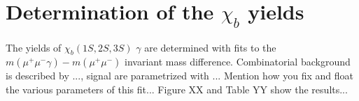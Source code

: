 % 

\section{Determination of the $\chi_b$ yields}
\label{sec:ChibFit}

The yields of $\chi_b(1S, 2S, 3S)$ \to \OneS $\gamma$ are determined with fits to the $m(\mu^+\mu^-\gamma) - m(\mu^+\mu^-)$ invariant mass difference. Combinatorial background is 
described by ..., signal are parametrized with ... Mention how you fix and float the various parameters of this fit... 
Figure XX and Table YY show the results... 